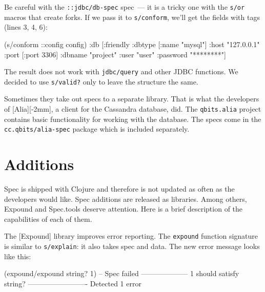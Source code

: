 
Be careful with the \verb|::jdbc/db-spec| spec~--- it is a tricky one with the \verb|s/or| macros that create forks. If we pass it to \verb|s/conform|, we'll get the fields with tags (lines 3, 4, 6):

\begin{english}
  \begin{clojure/lines}
(s/conform ::config config)
{:db
 [:friendly
  {:dbtype   [:name "mysql"]
   :host     "127.0.0.1"
   :port     [:port 3306]
   :dbname   "project"
   :user     "user"
   :password "********"}]}
  \end{clojure/lines}
\end{english}

The result does not work with \verb|jdbc/query| and other JDBC functions. We decided to use \verb|s/valid?| only to leave the structure the same.

Sometimes they take out specs to a separate library. That is what the developers of [Alia][-2mm], a client for the Cassandra database, did. The \verb|qbits.alia| project contains basic functionality for working with the database. The specs come in the \verb|cc.qbits/alia-spec| package which is included separately.

\section{Additions}

Spec is shipped with Clojure and therefore is not updated as often as the developers would like. Spec additions are released as libraries. Among others, Expound and Spec.tools deserve attention. Here is a brief description of the capabilities of each of them.


The [Expound] library improves error reporting. The \verb|expound| function signature is similar to \verb|s/explain|: it also takes spec and data. The new error message looks like this:


\begin{english}
  \begin{clojure}
(expound/expound string? 1)
-- Spec failed --------------------
  1
should satisfy
  string?
-------------------------
Detected 1 error
  \end{clojure}
\end{english}

